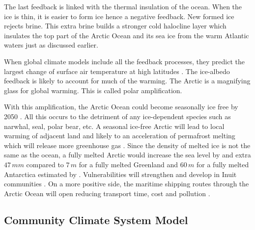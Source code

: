 The last feedback is linked with the thermal insulation of the ocean. When the ice is thin, it is easier to form ice hence a negative feedback. New formed ice rejects brine. This extra brine builds a stronger cold halocline layer which insulates the top part of the Arctic Ocean and its sea ice from the warm Atlantic waters just as discussed earlier. 

When global climate models include all the feedback processes, they predict the largest change of surface air temperature at high latitudes \citep{HollandBitz2003}. The ice-albedo feedback is likely to account for much of the warming. The Arctic is a magnifying glass for global warming. This is called polar amplification.

With this amplification, the Arctic Ocean could become seasonally ice free by 2050 \citep{Holland2006fa, GRL:GRL23061, GRL:GRL29477, ISI:000309414600002}. All this occurs to the detriment of any ice-dependent species such as narwhal, seal, polar bear, etc. \citep{Laidre07122008, Stirling2012pb,Tremblay:212fk, Norris2002} A seasonal ice-free Arctic will lead to local warming of adjacent land and likely to an acceleration of permafrost melting which will release more greenhouse gas \citep{permafrost,GRL:GRL24620}. Since the density of melted ice is not the same as the ocean, a fully melted Arctic would increase the sea level by and extra $47 \, mm$ \citep{SLRice} compared to $7 \, m$ for a fully melted Greenland and $60 \, m$ for a fully melted Antarctica estimated by \cite{GAslr}. Vulnerabilities will strengthen and develop in Inuit communities \citep{ford2006,ford2009}. On a more positive side, the maritime shipping routes through the Arctic Ocean will open reducing transport time, cost and pollution \citep{2016melia}.

\subsection{Community Climate System Model}\label{CCSM}

